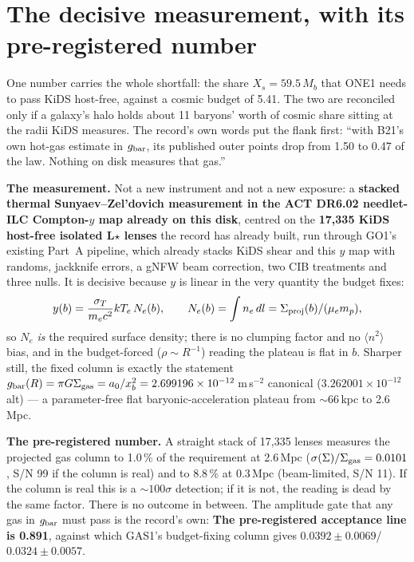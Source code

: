 \documentclass[10pt]{article}
\begin{document}
\section{The decisive measurement, with its pre-registered number}
\label{sec:decisive}

One number carries the whole shortfall: the share $X_s=59.5\,M_b$ that ONE1 needs to pass KiDS host-free,
against a cosmic budget of 5.41. The two are reconciled only if a galaxy's halo holds about 11 baryons' worth of
cosmic share sitting at the radii KiDS measures. The record's own words put the flank first: ``with B21's own
hot-gas estimate in $g_{\rm bar}$, its published outer points drop from 1.50 to 0.47 of the law. Nothing on disk
measures that gas.''

{\bf The measurement.} Not a new instrument and not a new exposure: a {\bf stacked thermal Sunyaev--Zel'dovich
measurement in the ACT DR6.02 needlet-ILC Compton-$y$ map already on this disk}, centred on the {\bf 17,335
KiDS host-free isolated L$\star$ lenses} the record has already built, run through GO1's existing Part~A
pipeline, which already stacks KiDS shear and this $y$ map with randoms, jackknife errors, a gNFW beam
correction, two CIB treatments and three nulls. It is decisive because $y$ is linear in the very quantity the
budget fixes:
\[
  y(b)=\frac{\sigma_T}{m_ec^2}kT_e\,N_e(b),\qquad N_e(b)=\int n_e\,dl=\Sigma_{\rm proj}(b)/(\mu_em_p),
\]
so $N_e$ {\it is} the required surface density; there is no clumping factor and no $\langle n^2\rangle$ bias, and
in the budget-forced ($\rho\sim R^{-1}$) reading the plateau is flat in $b$. Sharper still, the fixed column is
exactly the statement $g_{\rm bar}(R)=\pi G\Sigma_{\rm gas}=a_0/x_b^2=2.699196\times10^{-12}$\,m\,s$^{-2}$
canonical ($3.262001\times10^{-12}$ alt) --- a parameter-free flat baryonic-acceleration plateau from
$\sim66$\,kpc to 2.6\,Mpc.

{\bf The pre-registered number.} A straight stack of 17,335 lenses measures the projected gas column to 1.0\,\%
of the requirement at 2.6\,Mpc ($\sigma(\Sigma)/\Sigma_{\rm gas}=0.0101$, S/N 99 if the column is real) and to
8.8\,\% at 0.3\,Mpc (beam-limited, S/N 11). If the column is real this is a $\sim100\sigma$ detection; if it is
not, the reading is dead by the same factor. There is no outcome in between. The amplitude gate that any gas in
$g_{\rm bar}$ must pass is the record's own: {\bf The pre-registered acceptance line is 0.891}, against which
GAS1's budget-fixing column gives $0.0392\pm0.0069$/$0.0324\pm0.0057$.
\end{document}
